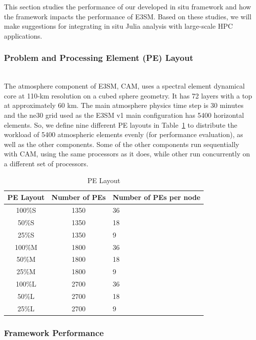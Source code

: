 \documentclass{juliacon}
\begin{document}
This section studies the performance of our developed in situ framework and how the framework impacts the performance of E3SM. Based on these studies, we will make suggestions for integrating in situ Julia analysis with large-scale HPC applications.

\subsubsection{Problem and Processing Element (PE) Layout}\hspace*{\fill} \\


The atmosphere component of E3SM, CAM, uses a spectral element dynamical core at 110-km resolution on a cubed sphere geometry. It has 72 layers with a top at approximately 60 km. The main atmosphere physics time step is 30 minutes and the ne30 grid used as the E3SM v1 main configuration has 5400 horizontal elements. So, we define nine different PE layouts in Table~\ref{table:layout} to distribute the workload of 5400 atmospheric elements evenly (for performance evaluation), as well as the other components. Some of the other components run sequentially with CAM, using the same processors as it does, while other run concurrently on a different set of processors. 




\begin{table}
  \caption{PE Layout}
  \label{table:layout}
  \begin{tabular}{ccl}
 \toprule
 PE Layout& Number of PEs & Number of PEs per node\\
 \midrule
 100\%S & 1350 & 36 \\
 50\%S  & 1350 & 18\\
 25\%S  & 1350 & 9\\
 100\%M & 1800 & 36\\
 50\%M  & 1800 & 18\\
 25\%M  & 1800 & 9\\
 100\%L & 2700 & 36\\
 50\%L  & 2700 & 18\\
 25\%L  & 2700 & 9\\
 \bottomrule
\end{tabular}
\end{table}


\subsubsection{Framework Performance}\hspace*{\fill} \\
\end{document}
